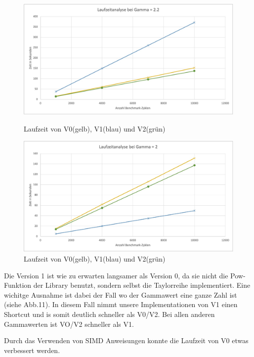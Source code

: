 \documentclass[course=erap]{aspdoc}
\begin{document}
\begin{figure}[h]
\begin{minipage}{0.55\textwidth}
\centering
\includegraphics[width=\textwidth]{Bilder/left.jpeg}
\caption{Laufzeit von V0(gelb), V1(blau) und V2(grün)}
\end{minipage}
\hfill
\begin{minipage}{0.55\textwidth}
\centering
\includegraphics[width=\textwidth]{Bilder/right.jpeg}
\caption{Laufzeit von V0(gelb), V1(blau) und V2(grün)}
\end{minipage}
\end{figure}
    
\par
Die Version 1 ist wie zu erwarten langsamer als Version 0, da sie nicht die Pow-Funktion der Library benutzt, sondern selbst die Taylorreihe implementiert. Eine wichitge Ausnahme ist dabei der Fall wo der Gammawert eine ganze Zahl ist (siehe Abb.11). In diesem Fall nimmt unsere Implementationen von V1 einen Shortcut und is somit deutlich schneller als V0/V2. Bei allen anderen Gammawerten ist VO/V2 schneller als V1. 

\par
Durch das Verwenden von SIMD Anweisungen konnte die Laufzeit von V0 etwas verbessert werden.
\end{document}
